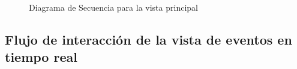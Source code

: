 \begin{figure}[H]
\caption{Diagrama de Secuencia para la vista principal}
\end{figure}

\subsection{Flujo de interacción de la vista de eventos en tiempo real}

